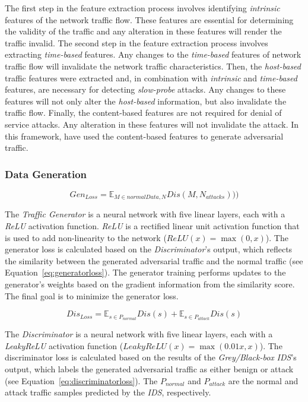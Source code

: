 The first step in the feature extraction process involves identifying \textit{intrinsic} features of the network
traffic flow.
These features are essential for determining the validity of the traffic and any alteration in these features will
render the traffic invalid.
The second step in the feature extraction process involves extracting \textit{time-based} features.
Any changes to the \textit{time-based} features of network traffic flow will invalidate the network traffic
characteristics.
Then, the \textit{host-based} traffic features were extracted and, in combination with \textit{intrinsic} and
\textit{time-based} features, are necessary for detecting \textit{slow-probe} attacks.
Any changes to these features will not only alter the \textit{host-based} information, but also invalidate the traffic
flow.
Finally, the content-based features are not required for denial of service attacks.
Any alteration in these features will not invalidate the attack.
In this framework, have used the content-based features to generate adversarial traffic.

\subsubsection{Data Generation}

\begin{equation}
    \label{eq:generatorloss}
    Gen_{Loss} = \mathbb{E}_{M \in normalData,N}Dis(M, N_{attacks})))
\end{equation}

The \textit{Traffic Generator} is a neural network with five linear layers, each with a \textit{ReLU} activation
function.
\textit{ReLU} is a rectified linear unit activation function that is used to add non-linearity to the
network ($ReLU(x) = \max(0, x)$).
The generator loss is calculated based on the \textit{Discriminator}’s output, which reflects the similarity between
the generated adversarial traffic and the normal traffic (see Equation~\ref{eq:generatorloss}).
The generator training performs updates to the generator’s weights based on the gradient information from the
similarity score.
The final goal is to minimize the generator loss.

\begin{equation}
    \label{eq:discriminatorloss}
    Dis_{Loss} = \mathbb{E}_{s \in P_{normal}}Dis(s) + \mathbb{E}_{s \in P_{attack}}Dis(s)
\end{equation}

The \textit{Discriminator} is a neural network with five linear layers, each with a \textit{LeakyReLU} activation
function ($LeakyReLU(x) = \max(0.01x, x)$).
The discriminator loss is calculated based on the results of the \textit{Grey/Black-box} \textit{IDS}’s output, which
labels the generated adversarial traffic as either benign or attack (see Equation~\ref{eq:discriminatorloss}).
The $P_{normal}$ and $P_{attack}$ are the normal and attack traffic samples predicted by the
\textit{IDS}, respectively.

